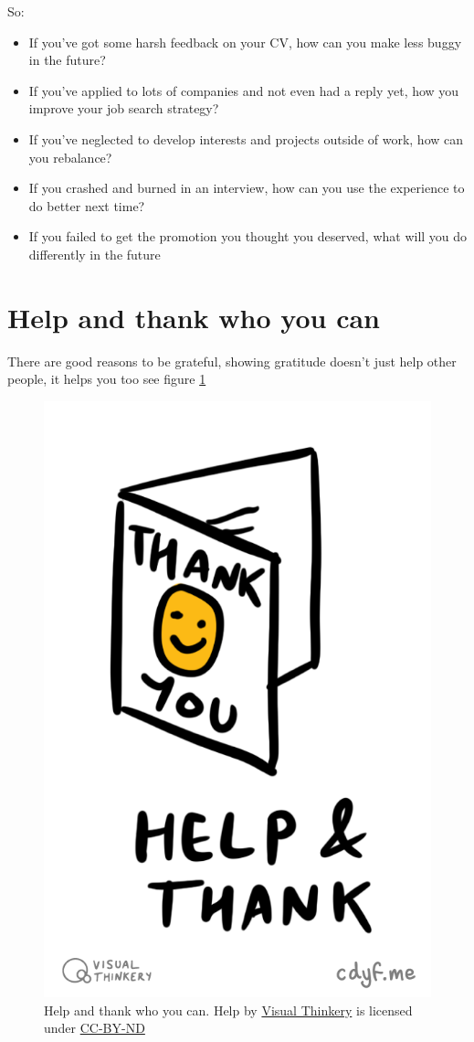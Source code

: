 \documentclass[
]{book}
\providecommand{\tightlist}{%
  \setlength{\itemsep}{0pt}\setlength{\parskip}{0pt}}
\begin{document}
So:

\begin{itemize}
\tightlist
\item
  If you've got some harsh feedback on your CV, how can you make less buggy in the future?
\item
  If you've applied to lots of companies and not even had a reply yet, how you improve your job search strategy?
\item
  If you've neglected to develop interests and projects outside of work, how can you rebalance?
\item
  If you crashed and burned in an interview, how can you use the experience to do better next time?
\item
  If you failed to get the promotion you thought you deserved, what will you do differently in the future
\end{itemize}

\hypertarget{gratitude}{%
\section{Help and thank who you can}\label{gratitude}}

There are good reasons to be grateful, showing gratitude doesn't just help other people, it helps you too see figure \ref{fig:helpandthank-fig}

\begin{figure}

{\centering \includegraphics[width=0.5\linewidth]{images/Help and Thank} 

}

\caption{Help and thank who you can. Help by \href{https://visualthinkery.com}{Visual Thinkery} is licensed under \href{https://creativecommons.org/licenses/by-nd/4.0/}{CC-BY-ND}}\label{fig:helpandthank-fig}
\end{figure}
\end{document}
